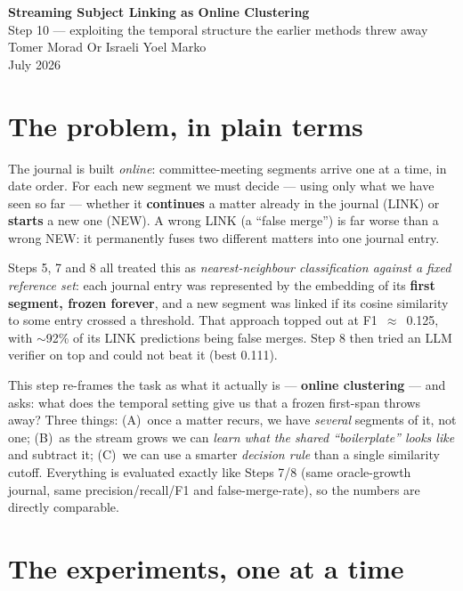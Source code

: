\documentclass[11pt,a4paper]{article}
\begin{document}
\begin{center}
  {\LARGE \textbf{Streaming Subject Linking as Online Clustering}}\\[0.3em]
  {\large Step 10 --- exploiting the temporal structure the earlier methods threw away}\\[0.6em]
  {\normalsize Tomer Morad \quad Or Israeli \quad Yoel Marko}\\
  {\normalsize July 2026}
\end{center}

\vspace{0.4em}

\section{The problem, in plain terms}

The journal is built \emph{online}: committee-meeting segments arrive one at a time, in
date order. For each new segment we must decide --- using only what we have seen so far ---
whether it \textbf{continues} a matter already in the journal (LINK) or \textbf{starts} a
new one (NEW). A wrong LINK (a ``false merge'') is far worse than a wrong NEW: it
permanently fuses two different matters into one journal entry.

Steps 5, 7 and 8 all treated this as \emph{nearest-neighbour classification against a fixed
reference set}: each journal entry was represented by the embedding of its \textbf{first
segment, frozen forever}, and a new segment was linked if its cosine similarity to some
entry crossed a threshold. That approach topped out at F1~$\approx$~0.125, with $\sim$92\% of
its LINK predictions being false merges. Step 8 then tried an LLM verifier on top and could
not beat it (best 0.111).

This step re-frames the task as what it actually is --- \textbf{online clustering} --- and
asks: what does the temporal setting give us that a frozen first-span throws away? Three
things: (A)~once a matter recurs, we have \emph{several} segments of it, not one; (B)~as the
stream grows we can \emph{learn what the shared ``boilerplate'' looks like} and subtract it;
(C)~we can use a smarter \emph{decision rule} than a single similarity cutoff. Everything is
evaluated exactly like Steps 7/8 (same oracle-growth journal, same precision/recall/F1 and
false-merge-rate), so the numbers are directly comparable.

\section{The experiments, one at a time}
\end{document}
